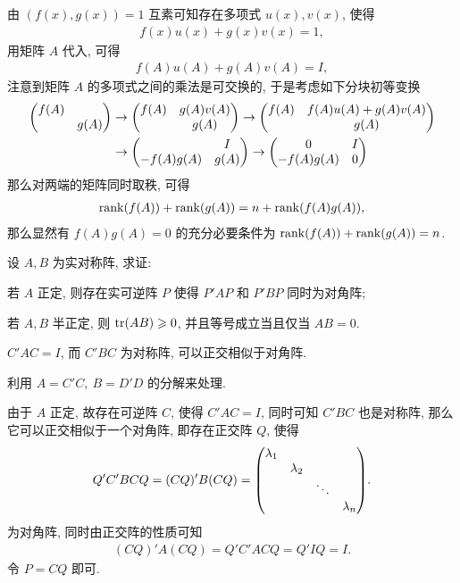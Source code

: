 \begin{exercise}[series=exer]
\begin{hint}
  \end{hint}
  \begin{answer}
      由 $ (f(x), g(x)) = 1 $ 互素可知存在多项式 $ u(x), v(x) $, 使得
      \begin{align*}
          f(x)u(x) + g(x)v(x) = 1,
      \end{align*}
      用矩阵 $ A $ 代入, 可得
      \begin{align*}
          f(A)u(A) + g(A)v(A) = I,
      \end{align*}
      注意到矩阵 $ A $ 的多项式之间的乘法是可交换的, 于是考虑如下分块初等变换
      \begin{align*}
          \mqty(f(A) & \\ & g(A)) & \rightarrow \mqty(f(A) & g(A)v(A) \\ & g(A)) \rightarrow \mqty(f(A) & f(A)u(A) + g(A)v(A) \\ & g(A)) \\
                                  & \rightarrow \mqty( & I \\ -f(A)g(A) & g(A)) \rightarrow \mqty( 0 & I \\ -f(A)g(A) & 0 )
      \end{align*}
      那么对两端的矩阵同时取秩, 可得
      \begin{align*}
          \rank(f(A)) + \rank(g(A)) = n + \rank(f(A)g(A)),
      \end{align*}
      那么显然有 $ f(A)g(A) = 0 $ 的充分必要条件为 $ \rank(f(A)) + \rank(g(A)) = n $.
  \end{answer}
  \item 设 $ A, B $ 为实对称阵, 求证:
  \begin{exercise}
      \item 若 $ A $ 正定, 则存在实可逆阵 $ P $ 使得 $ P'AP $ 和 $ P'BP $ 同时为对角阵;
      \item 若 $ A, B $ 半正定, 则 $ \tr(AB) \geqslant 0 $, 并且等号成立当且仅当 $ AB = 0 $.
  \end{exercise}
  \begin{hint}
      \begin{hintsheet}
          \item $ C'AC = I $, 而 $ C'BC $ 为对称阵, 可以正交相似于对角阵.
          \item 利用 $ A = C'C,\ B = D'D $ 的分解来处理.
      \end{hintsheet}
  \end{hint}
  \begin{answer}
      \begin{answersheet}
          \item 由于 $ A $ 正定, 故存在可逆阵 $ C $, 使得 $ C'AC = I $, 同时可知 $ C'BC $ 也是对称阵, 那么它可以正交相似于一个对角阵, 即存在正交阵 $ Q $, 使得
          \begin{align*}
              Q'C'BCQ = (CQ)'B(CQ) = \mqty(\dmat{\lambda_{1}, \lambda_{2}, \ddots, \lambda_{n}}).
          \end{align*}
          为对角阵, 同时由正交阵的性质可知
          \begin{align*}
              (CQ)'A(CQ) = Q'C'ACQ = Q'IQ = I.
          \end{align*}
          令 $ P = CQ $ 即可.


\end{answersheet}
\end{answer}
\end{exercise}
